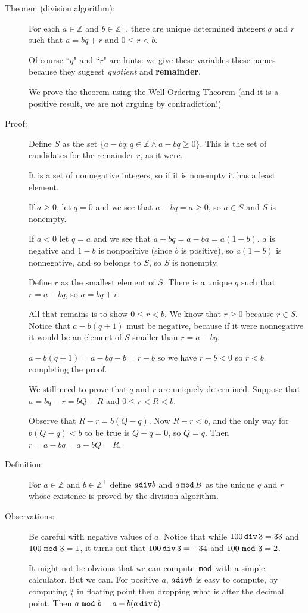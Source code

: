 \documentclass[12pt]{article}
\begin{document}
\begin{description}

\item[Theorem (division algorithm):]  For each $a \in {\mathbb Z}$ and $b \in {\mathbb Z}^+$, there are unique determined integers $q$ and $r$ such that $a=bq+r$ and $0 \leq r <b$.

Of course ``$q$" and ``$r$" are hints:  we give these variables these names because they suggest {\em quotient\/} and {\bf remainder\/}.

We prove the theorem using the Well-Ordering Theorem (and it is a positive result, we are not arguing by contradiction!)

\item[Proof:]

Define $S$ as the set $\{a-bq:q \in {\mathbb Z} \wedge a-bq\geq 0\}$.  This is the set of candidates for the remainder $r$, as it were.

It is a set of nonnegative integers, so if it is nonempty it has a least element.

If $a\geq 0$, let $q=0$ and we see that $a-bq=a\geq 0$, so $a \in S$ and $S$ is nonempty.

If $a <0$ let $q=a$ and we see that $a-bq = a-ba=a(1-b)$.  $a$ is negative and $1-b$ is nonpositive (since $b$ is positive), so $a(1-b)$ is nonnegative, and so belongs to $S$, so $S$ is nonempty.

Define $r$ as the smallest element of $S$.  There is a unique $q$ such that $r=a-bq$, so $a=bq+r$.

All that remains is to show $0 \leq r<b$.  We know that $r \geq 0$ because $r \in S$.  Notice that $a-b(q+1)$ must be negative, because
if it were nonnegative it would be an element of $S$ smaller than $r=a-bq$.

$a-b(q+1) = a-bq-b=r-b$ so we have $r-b<0$ so $r<b$ completing the proof.


We still need to prove that $q$ and $r$ are uniquely determined.  Suppose that $a=bq-r = bQ-R$ and $0\leq r < R <b$.

Observe that $R-r = b(Q-q)$.  Now $R-r<b$, and the only way for $b(Q-q)<b$ to be true is $Q-q=0$, so $Q=q$.  Then $r=a-bq = a-bQ = R$.

\item[Definition:]  For $a \in {\mathbb Z}$ and $b \in {\mathbb Z}^+$ define $a {\tt div} b$ and $a \,{\tt mod}\, B$ as the unique $q$ and $r$ whose existence is proved by the division algorithm.

\item[Observations:]  Be careful with negative values of $a$.  Notice that while $100 \,{\tt div}\, 3 = 33$ and $100\, \,{\tt mod}\,\, 3 = 1$, it turns out that 
$100\, {\tt div}\, 3 = -34$ and $100 \,\,{\tt mod}\, \,3 = 2$.

It might not be obvious that we can compute \,{\tt mod}\, with a simple calculator.  But we can.  For positive $a$, $a {\tt div} b$ is easy to compute, by computing $\frac ab$ in floating point then dropping what is after the decimal point.  Then $a\, \,{\tt mod}\,\, b=a - b(a\,{\tt div}\,b)$.


\end{description}
\end{document}

